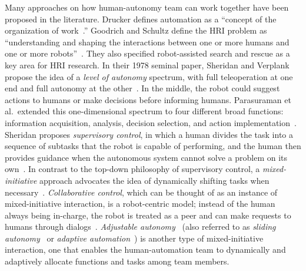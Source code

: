 \documentclass[lettersize, apacite, twoside, HRI]{apa_HRI}
\begin{document}
Many approaches on how human-autonomy team can work together have been proposed in the literature. Drucker defines automation as a ``concept of the organization of work~\cite{Drucker2006Practice}.'' Goodrich and Schultz define the HRI problem as ``understanding and shaping the interactions between one or more humans and one or more robots''~\cite{Goodrich2007HRISurvey}. They also specified robot-assisted search and rescue as a key area for HRI research. In their 1978 seminal paper, Sheridan and Verplank propose the idea of a \textit{level of autonomy} spectrum, with full teleoperation at one end and full autonomy at the other~\cite{Sheridan1978Human}. In the middle, the robot could suggest actions to humans or make decisions before informing humans. Parasuraman et al.\ extended this one-dimensional spectrum to four different broad functions: information acquisition, analysis, decision selection, and action implementation~\cite{Parasuraman2000Model}. Sheridan proposes \textit{supervisory control}, in which a human divides the task into a sequence of subtasks that the robot is capable of performing, and the human then provides guidance when the autonomous system cannot solve a problem on its own~\cite{Sheridan1992Telerobotics}. In contrast to the top-down philosophy of supervisory control, a \textit{mixed-initiative} approach advocates the idea of dynamically shifting tasks when necessary~\cite{Hearst1999Mixed}. \textit{Collaborative control}, which can be thought of as an instance of mixed-initiative interaction, is a robot-centric model; instead of the human always being in-charge, the robot is treated as a peer and can make requests to humans through dialogs~\cite{Fong1999Collaborative}. \textit{Adjustable autonomy}~\cite{Dorais2001Designing} (also referred to as \textit{sliding autonomy}~\cite{Dias2008SlidingAutonomy} or \textit{adaptive automation}~\cite{Rouse1988Adaptive}) is another type of mixed-initiative interaction, one that enables the human-automation team to dynamically and adaptively allocate functions and tasks among team members. 
\end{document}
